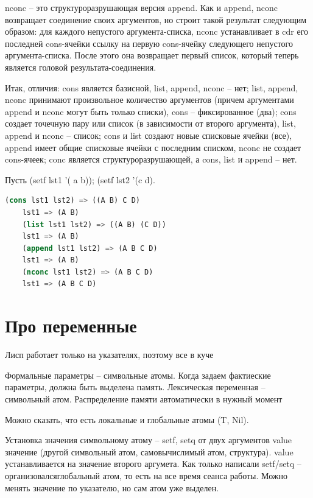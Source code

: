 \documentclass{article}
\begin{document}
nconc -- это структуроразрушающая версия append. Как и append, nconc возвращает соединение своих аргументов, но строит такой результат следующим образом: для каждого непустого аргумента-списка, nconc устанавливает в cdr его последней cons-ячейки ссылку на первую cons-ячейку следующего непустого аргумента-списка. После этого она возвращает первый список, который теперь является головой результата-соединения.

Итак, отличия: cons является базисной, list, append, nconc -- нет; list, append, nconc принимают произвольное количество аргументов (причем аргументами append и nconc могут быть только списки), cons -- фиксированное (два); cons создает точечную пару или список (в зависимости от второго аргумента), list, append и nconc -- список; cons и list создают новые списковые ячейки (все), append имеет общие списковые ячейки с последним списком, nconc не создает cons-ячеек; conc является структуроразрушающей, а cons, list и append -- нет.

Пусть (setf lst1 '( a b)); (setf lst2 '(c d).



\begin{lstlisting}[language=Lisp]	
	(cons lst1 lst2) => ((A B) C D)
	lst1 => (A B)
	(list lst1 lst2) => ((A B) (C D))
	lst1 => (A B)
	(append lst1 lst2) => (A B C D)
	lst1 => (A B)
	(nconc lst1 lst2) => (A B C D)
	lst1 => (A B C D)
\end{lstlisting}



\section*{Про переменные}

Лисп работает только на указателях, поэтому все в куче

Формальные параметры -- символьные атомы. Когда задаем фактиеские параметры, должна быть выделена память. Лексическая переменная -- символьный атом. Распределение памяти автоматически в нужный момент

Можно сказать, что есть локальные и глобальные атомы (T, Nil).

Установка значения символьному атому -- setf, setq от двух аргументов value значение (другой символьный атом, самовычислимый атом, структура). value устанавливается на значение второго аргумета. Как только написали setf/setq -- организовалсяглобальный атом, то есть на все время сеанса работы. Можно менять значение по указателю, но сам атом уже выделен.
\end{document}
